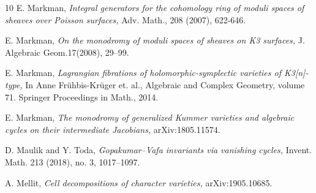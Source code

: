 \documentclass[11pt]{amsart}
\theoremstyle{plain}
\theoremstyle{definition}
\theoremstyle{remark}
\begin{document}
\begin{thebibliography}{10}
 E. Markman, {\em Integral generators for the cohomology ring of moduli spaces of sheaves over Poisson surfaces,}
Adv. Math., 208 (2007), 622-646.

 E. Markman, {\em On the monodromy of moduli spaces of sheaves on K3 surfaces,} J. Algebraic Geom.17(2008), 29--99.


 E. Markman, {\em Lagrangian fibrations of holomorphic-symplectic varieties of K3[n]-type,} In Anne Fr\"uhbis-Kr\"uger et. al., Algebraic and Complex Geometry, volume 71. Springer Proceedings in Math., 2014.


 E. Markman, {\em The monodromy of generalized Kummer varieties and algebraic cycles on their intermediate Jacobians,} arXiv:1805.11574.







 D. Maulik and Y. Toda, {\em Gopakumar--Vafa invariants via vanishing cycles,} Invent. Math. 213 (2018), no. 3, 1017--1097. 

 A. Mellit, {\em Cell decompositions of character varieties,} arXiv:1905.10685.





\end{thebibliography}
\end{document}
